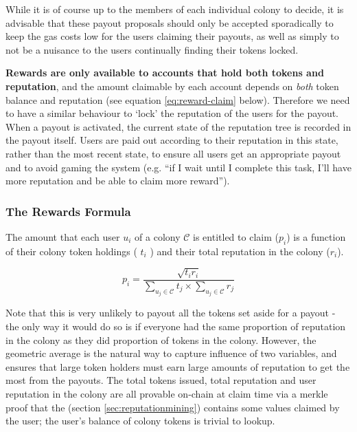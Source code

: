 While it is of course up to the members of each individual colony to decide, it is advisable that these payout proposals should only be accepted sporadically to keep the gas costs low for the users claiming their payouts, as well as simply to not be a nuisance to the users continually finding their tokens locked.

\textbf{Rewards are only available to accounts that hold both tokens and reputation}, and the amount claimable by each account depends on \emph{both} token balance and reputation (see equation \eqref{eq:reward-claim} below). Therefore we need to have a similar behaviour to `lock' the reputation of the users for the payout. When a payout is activated, the current state of the reputation tree is recorded in the payout itself. Users are paid out according to their reputation in this state, rather than the most recent state, to ensure all users get an appropriate payout and to avoid gaming the system (e.g. ``if I wait until I complete this task, I'll have more reputation and be able to claim more reward'').

\subsubsection*{The Rewards Formula}
The amount that each user $u_i$ of a colony $\mathcal{C}$ is entitled to claim ($p_i$) is a function of their colony token holdings ( $t_i$ ) and their total reputation in the colony ($r_i$).

\begin{equation}\label{eq:reward-claim}
 p_i = \frac{\sqrt{t_i r_i}}{\sum\limits_{u_j\in \mathcal{C}} t_j \times \sum\limits_{u_j\in \mathcal{C}} r_j}
\end{equation}

Note that this is very unlikely to payout all the tokens set aside for a payout - the only way it would do so is if everyone had the same proportion of reputation in the colony as they did proportion of tokens in the colony. However, the geometric average is the natural way to capture influence of two variables, and ensures that large token holders must earn large amounts of reputation to get the most from the payouts. The total tokens issued, total reputation and user reputation in the colony are all provable on-chain at claim time via a merkle proof that the  (section \ref{sec:reputationmining}) contains some values claimed by the user; the user's balance of colony tokens is trivial to lookup.

